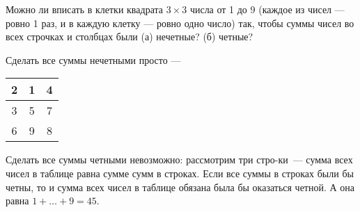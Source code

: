 \begin{itemize}

	\itB Можно ли вписать в клетки квадрата $3\times 3$ числа от 1 до 9 (каждое из чисел — ровно 1 раз, и в каждую клетку — ровно одно число) так, чтобы суммы чисел во всех строчках и столбцах были (а) нечетные? (б) четные?
	
	\itr Сделать все суммы нечетными просто —
	\begin{center} \begin{tabular}{c|c|c}
		2 & 1 & 4 \\ \hline
		3 & 5 & 7 \\ \hline
		6 & 9 & 8 
	\end{tabular} \end{center}
	
	Сделать все суммы четными невозможно: рассмотрим три стро-\linebreak ки~— сумма всех чисел в таблице равна сумме сумм в строках. Если все суммы в строках были бы четны, то и сумма всех чисел в таблице обязана была бы оказаться четной. А она равна $1 + \ldots + 9 = 45$.

\end{itemize}


